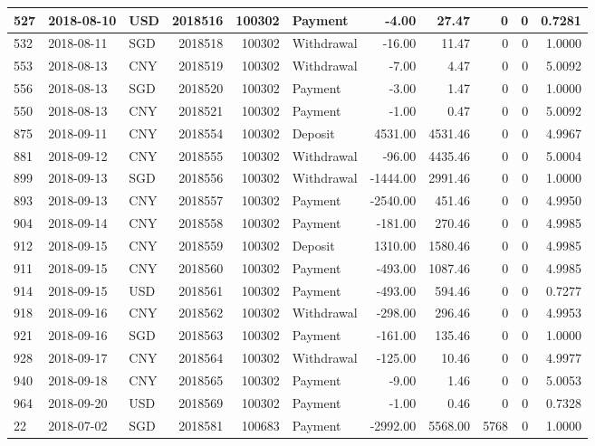 \documentclass[]{article}
\begin{document}
\begin{table}[H]
\begin{tabular}{l|l|l|r|r|l|r|r|r|r|r}
527 & 2018-08-10 & USD & 2018516 & 100302 & Payment & -4.00 & 27.47 & 0 & 0 & 0.7281\\
\hline
532 & 2018-08-11 & SGD & 2018518 & 100302 & Withdrawal & -16.00 & 11.47 & 0 & 0 & 1.0000\\
\hline
553 & 2018-08-13 & CNY & 2018519 & 100302 & Withdrawal & -7.00 & 4.47 & 0 & 0 & 5.0092\\
\hline
556 & 2018-08-13 & SGD & 2018520 & 100302 & Payment & -3.00 & 1.47 & 0 & 0 & 1.0000\\
\hline
550 & 2018-08-13 & CNY & 2018521 & 100302 & Payment & -1.00 & 0.47 & 0 & 0 & 5.0092\\
\hline
875 & 2018-09-11 & CNY & 2018554 & 100302 & Deposit & 4531.00 & 4531.46 & 0 & 0 & 4.9967\\
\hline
881 & 2018-09-12 & CNY & 2018555 & 100302 & Withdrawal & -96.00 & 4435.46 & 0 & 0 & 5.0004\\
\hline
899 & 2018-09-13 & SGD & 2018556 & 100302 & Withdrawal & -1444.00 & 2991.46 & 0 & 0 & 1.0000\\
\hline
893 & 2018-09-13 & CNY & 2018557 & 100302 & Payment & -2540.00 & 451.46 & 0 & 0 & 4.9950\\
\hline
904 & 2018-09-14 & CNY & 2018558 & 100302 & Payment & -181.00 & 270.46 & 0 & 0 & 4.9985\\
\hline
912 & 2018-09-15 & CNY & 2018559 & 100302 & Deposit & 1310.00 & 1580.46 & 0 & 0 & 4.9985\\
\hline
911 & 2018-09-15 & CNY & 2018560 & 100302 & Payment & -493.00 & 1087.46 & 0 & 0 & 4.9985\\
\hline
914 & 2018-09-15 & USD & 2018561 & 100302 & Payment & -493.00 & 594.46 & 0 & 0 & 0.7277\\
\hline
918 & 2018-09-16 & CNY & 2018562 & 100302 & Withdrawal & -298.00 & 296.46 & 0 & 0 & 4.9953\\
\hline
921 & 2018-09-16 & SGD & 2018563 & 100302 & Payment & -161.00 & 135.46 & 0 & 0 & 1.0000\\
\hline
928 & 2018-09-17 & CNY & 2018564 & 100302 & Withdrawal & -125.00 & 10.46 & 0 & 0 & 4.9977\\
\hline
940 & 2018-09-18 & CNY & 2018565 & 100302 & Payment & -9.00 & 1.46 & 0 & 0 & 5.0053\\
\hline
964 & 2018-09-20 & USD & 2018569 & 100302 & Payment & -1.00 & 0.46 & 0 & 0 & 0.7328\\
\hline
22 & 2018-07-02 & SGD & 2018581 & 100683 & Payment & -2992.00 & 5568.00 & 5768 & 0 & 1.0000\\
\hline

\end{tabular}
\end{table}
\end{document}
